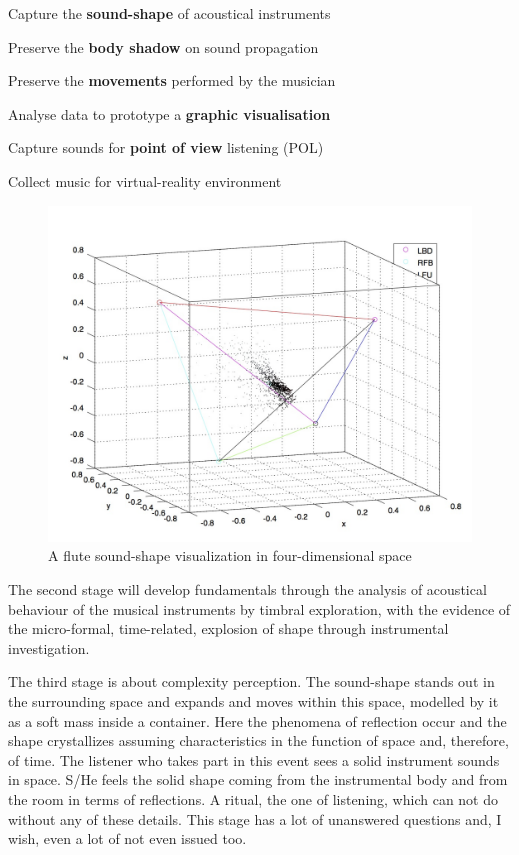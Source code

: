 \documentclass[
	12pt,
	a4paper,
	twocolumn
	]{article}
\begin{document}
\begin{compactitem}
\item Capture the \textbf{sound-shape} of acoustical instruments
\item Preserve the \textbf{body shadow} on sound propagation
\item Preserve the \textbf{movements} performed by the musician
\item Analyse data to prototype a \textbf{graphic visualisation}
\item Capture sounds for \textbf{point of view} listening (POL)
\item Collect music for virtual-reality environment
\end{compactitem}


\begin{figure}[htbp]
\begin{center}
\includegraphics[width=.47\textwidth]{img/13230_1024_2.jpg}
\caption{A flute sound-shape visualization in four-dimensional space}
\label{shape}
\end{center}
\end{figure}



The second stage will develop fundamentals through the analysis of acoustical behaviour of the musical instruments by timbral exploration, with the evidence of the micro-formal, time-related, explosion of shape through instrumental investigation.

The third stage is about complexity perception. The sound-shape stands out in the surrounding space and expands and moves within this space, modelled by it as a soft mass inside a container. Here the phenomena of reflection occur and the shape crystallizes assuming characteristics in the function of space and, therefore, of time. The listener who takes part in this event sees a solid instrument sounds in space. S/He feels the solid shape coming from the instrumental body and from the room in terms of reflections. A ritual, the one of listening, which can not do without any of these details. This stage has a lot of unanswered questions and, I wish, even a lot of not even issued too. 
\end{document}
